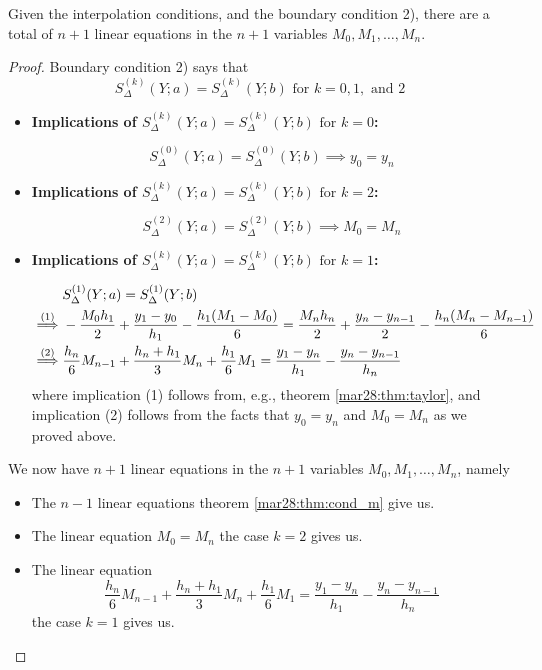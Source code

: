 \begin{thm}
  Given the interpolation conditions, and the boundary condition 2), there are a total of $n+1$ linear equations in the $n+1$ variables $M_0, M_1, \dots , M_n$.
\end{thm}
\begin{proof}
  Boundary condition 2) says that
  \[
    S^{(k)}_\Delta(Y ; a) = S^{(k)}_\Delta(Y ; b) \text{ for } k = 0, 1, \text{ and } 2
  \]

  \begin{itemize}
  \item
    \textbf{Implications of $S^{(k)}_\Delta(Y ; a) = S^{(k)}_\Delta(Y ; b) \text{ for } k = 0$:}

    \[
      S^{(0)}_\Delta(Y ; a) = S^{(0)}_\Delta(Y ; b)
      \implies
      y_0 = y_n
    \]
    \item
    \textbf{Implications of $S^{(k)}_\Delta(Y ; a) = S^{(k)}_\Delta(Y ; b) \text{ for } k = 2$:}

    \[
      S^{(2)}_\Delta(Y ; a) = S^{(2)}_\Delta(Y ; b)
      \implies
      M_0 = M_n
    \]
  \item
    \textbf{Implications of $S^{(k)}_\Delta(Y ; a) = S^{(k)}_\Delta(Y ; b) \text{ for } k = 1$:}

    \begin{align*}
      &S^{(1)}_\Delta(Y ; a) = S^{(1)}_\Delta(Y ; b) \\
      \lao[\implies]{1}&
                         -\frac{M_0h_1}{2} + \frac{y_1 - y_0}{h_1} - \frac{h_1(M_1 - M_0)}{6}
                         =
                         \frac{M_nh_n}{2} + \frac{y_n - y_{n-1}}{2} - \frac{h_n(M_n - M_{n-1})}{6} \\
      \lao[\implies]{2}&
                         \frac{h_n}{6}M_{n-1} + \frac{h_n + h_{1}}{3}M_n + \frac{h_{1}}{6}M_{1}
                         =
                         \frac{y_{1} - y_n}{h_{1}} - \frac{y_n - y_{n-1}}{h_n}
    \end{align*}
    where implication (1) follows from, e.g., theorem \ref{mar28:thm:taylor}, and implication (2) follows from the facts that $y_0 = y_n$ and $M_0 = M_n$ as we proved above.
  \end{itemize}

  We now have $n+1$ linear equations in the $n+1$ variables $M_0, M_1, \dots , M_n$, namely
  \begin{itemize}
  \item
    The $n-1$ linear equations theorem \ref{mar28:thm:cond_m} give us.
  \item
    The linear equation $M_0 = M_n$ the case $k = 2$ gives us.
  \item
    The linear equation
    \[
      \frac{h_n}{6}M_{n-1} + \frac{h_n + h_{1}}{3}M_n + \frac{h_{1}}{6}M_{1}
      =
      \frac{y_{1} - y_n}{h_{1}} - \frac{y_n - y_{n-1}}{h_n}
    \]
    the case $k = 1$ gives us.
  \end{itemize}
  \hfill
\end{proof}

